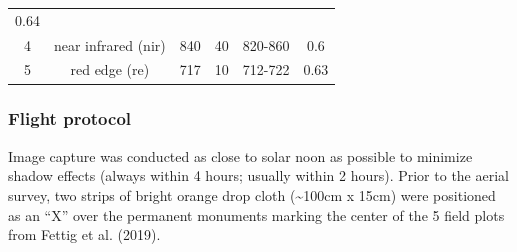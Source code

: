 \documentclass[]{article}
\begin{document}
\begin{longtable}[]{@{}cccccc@{}}
\begin{minipage}[t]{0.14\columnwidth}
0.64\strut
\end{minipage}\tabularnewline
\begin{minipage}[t]{0.10\columnwidth}\centering\strut
4\strut
\end{minipage} & \begin{minipage}[t]{0.23\columnwidth}\centering\strut
near infrared (nir)\strut
\end{minipage} & \begin{minipage}[t]{0.14\columnwidth}\centering\strut
840\strut
\end{minipage} & \begin{minipage}[t]{0.09\columnwidth}\centering\strut
40\strut
\end{minipage} & \begin{minipage}[t]{0.14\columnwidth}\centering\strut
820-860\strut
\end{minipage} & \begin{minipage}[t]{0.14\columnwidth}\centering\strut
0.6\strut
\end{minipage}\tabularnewline
\begin{minipage}[t]{0.10\columnwidth}\centering\strut
5\strut
\end{minipage} & \begin{minipage}[t]{0.23\columnwidth}\centering\strut
red edge (re)\strut
\end{minipage} & \begin{minipage}[t]{0.14\columnwidth}\centering\strut
717\strut
\end{minipage} & \begin{minipage}[t]{0.09\columnwidth}\centering\strut
10\strut
\end{minipage} & \begin{minipage}[t]{0.14\columnwidth}\centering\strut
712-722\strut
\end{minipage} & \begin{minipage}[t]{0.14\columnwidth}\centering\strut
0.63\strut
\end{minipage}\tabularnewline
\bottomrule
\end{longtable}

\subsubsection{Flight protocol}\label{flight-protocol}

Image capture was conducted as close to solar noon as possible to
minimize shadow effects (always within 4 hours; usually within 2 hours).
Prior to the aerial survey, two strips of bright orange drop cloth
(\textasciitilde{}100cm x 15cm) were positioned as an ``X'' over the
permanent monuments marking the center of the 5 field plots from Fettig
et al. (2019).
\end{document}
